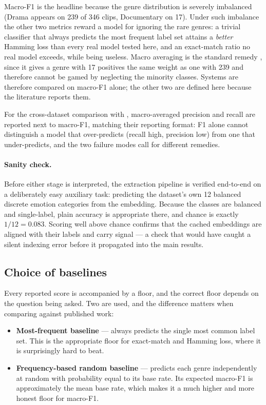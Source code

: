Macro-F1 is the headline because the genre distribution is severely imbalanced (Drama
appears on 239 of 346 clips, Documentary on 17). Under such imbalance the other two
metrics reward a model for ignoring the rare genres: a trivial classifier that always
predicts the most frequent label set attains a \emph{better} Hamming loss than every real
model tested here, and an exact-match ratio no real model exceeds, while being useless. Macro
averaging is the standard remedy \citep{sokolova2009systematic}, since it gives a genre
with 17 positives the same weight as one with 239 and therefore cannot be gamed by
neglecting the minority classes. Systems are therefore compared on macro-F1 alone; the
other two are defined here because the literature reports them.

For the cross-dataset comparison with \citet{ma2021computational}, macro-averaged
precision and recall are reported next to macro-F1, matching their reporting format: F1
alone cannot distinguish a model that over-predicts (recall high, precision low) from one
that under-predicts, and the two failure modes call for different remedies.

\paragraph{Sanity check.}
Before either stage is interpreted, the extraction pipeline is verified end-to-end on a
deliberately easy auxiliary task: predicting the dataset's own 12 balanced discrete emotion
categories from the embedding. Because the classes are balanced and single-label, plain
accuracy is appropriate there, and chance is exactly $1/12 = 0.083$. Scoring well above
chance confirms that the cached embeddings are aligned with their labels and carry
signal --- a check that would have caught a silent indexing error before it propagated
into the main results.

\subsection{Choice of baselines}

Every reported score is accompanied by a floor, and the correct floor depends on the
question being asked. Two are used, and the difference matters when comparing against
published work:

\begin{itemize}
  \item \textbf{Most-frequent baseline} --- always predicts the single most common label
    set. This is the appropriate floor for exact-match and Hamming loss, where it is
    surprisingly hard to beat.
  \item \textbf{Frequency-based random baseline} --- predicts each genre independently at
    random with probability equal to its base rate. Its expected macro-F1 is approximately
    the mean base rate, which makes it a much higher and more honest floor for macro-F1.
\end{itemize}

